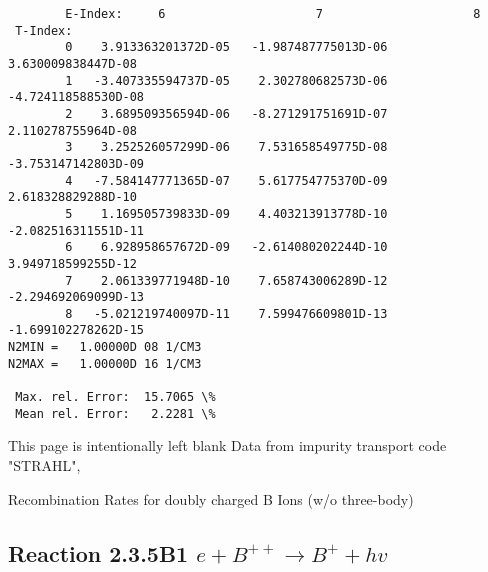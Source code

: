 \documentclass[12pt,dvipdfmx]{article}
\begin{document}
\begin{small}
\begin{verbatim}
        E-Index:     6                     7                     8
 T-Index:
        0    3.913363201372D-05   -1.987487775013D-06    3.630009838447D-08
        1   -3.407335594737D-05    2.302780682573D-06   -4.724118588530D-08
        2    3.689509356594D-06   -8.271291751691D-07    2.110278755964D-08
        3    3.252526057299D-06    7.531658549775D-08   -3.753147142803D-09
        4   -7.584147771365D-07    5.617754775370D-09    2.618328829288D-10
        5    1.169505739833D-09    4.403213913778D-10   -2.082516311551D-11
        6    6.928958657672D-09   -2.614080202244D-10    3.949718599255D-12
        7    2.061339771948D-10    7.658743006289D-12   -2.294692069099D-13
        8   -5.021219740097D-11    7.599476609801D-13   -1.699102278262D-15
N2MIN =   1.00000D 08 1/CM3
N2MAX =   1.00000D 16 1/CM3

 Max. rel. Error:  15.7065 \%
 Mean rel. Error:   2.2281 \%

\end{verbatim}\end{small}
\newpage
This page is intentionally left blank
\newpage
Data from impurity transport code "STRAHL", \cite{kn:Behringer}

  Recombination Rates for doubly charged B Ions (w/o three-body)
\subsection{
Reaction 2.3.5B1  $e + B^{++} \rightarrow B^+ + hv$
}
\end{document}
